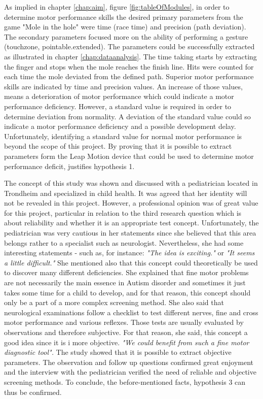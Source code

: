 As implied in chapter \ref{chap:aim}, figure \ref{fig:tableOfModules}, in order to determine motor performance skills
the desired primary parameters from the game "Mole in the hole" were time (race time) and precision (path deviation). The secondary parameters focused more on the ability of performing a gesture (touchzone, pointable.extended). The parameters could be successfully extracted as illustrated in chapter \ref{chap:dataanalysis}. The time taking starts by extracting the finger and stops when the mole reaches the finish line. Hits were counted for each time the mole deviated from the defined path. Superior motor performance skills are indicated by time and precision values. An increase of those values, means a deterioration of motor performance which could indicate a motor performance deficiency. However, a standard value is required in order to determine deviation from normality. A deviation of the standard value could so indicate a motor performance deficiency and a possible development delay. 
Unfortunately, identifying a standard value for normal motor performance is beyond the scope of this project. 
By proving that it is possible to extract parameters form the Leap Motion device that could be used to determine motor performance deficit, justifies hypothesis 1. 

The concept of this study was shown and discussed with a pediatrician located in Trondheim and specialized in child health. It was agreed that her identity will not be revealed in this project. However, a professional opinion was of great value for this project, particular in relation to the third research question which is about reliability and whether it is an appropriate test concept. Unfortunately, the pediatrician was very cautious in her statements since she believed that this area belongs rather to a specialist such as neurologist. Nevertheless, she had some interesting statements - such as, for instance: \textit{"The idea is exciting."} or \textit{"It seems a little difficult."} She mentioned also that this concept could theoretically be used to discover many different deficiencies. She explained that fine motor problems are not necessarily the main essence in Autism disorder and sometimes it just takes some time for a child to develop, and for that reason, this concept should only be a part of a more complex screening method. She also said that neurological examinations follow a checklist to test different nerves, fine and cross motor performance and various reflexes. Those tests are usually evaluated by observations and therefore subjective. For that reason, she said, this concept a good idea since it is  i more objective. \textit{"We could benefit from such a fine motor diagnostic tool".} 
The study showed that it is possible to extract objective parameters. The observation and follow up questions confirmed great enjoyment and the interview with the pediatrician verified the need of reliable and objective screening methods. To conclude, the before-mentioned facts, hypothesis 3 can thus be confirmed. 




